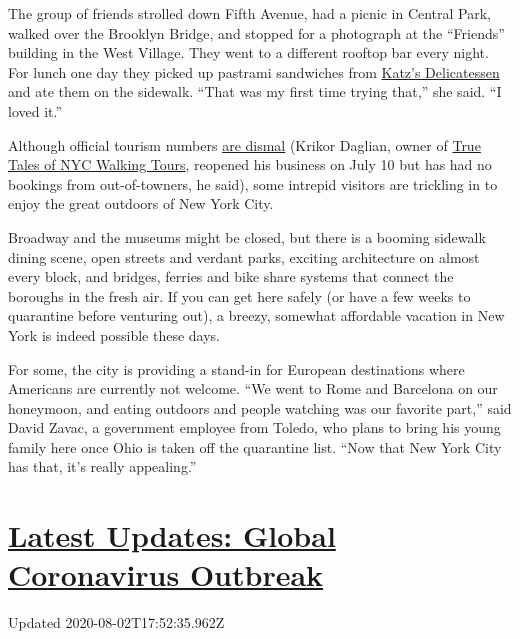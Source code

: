 The group of friends strolled down Fifth Avenue, had a picnic in Central
Park, walked over the Brooklyn Bridge, and stopped for a photograph at
the ``Friends'' building in the West Village. They went to a different
rooftop bar every night. For lunch one day they picked up pastrami
sandwiches from \href{https://katzsdelicatessen.com/}{Katz's
Delicatessen} and ate them on the sidewalk. ``That was my first time
trying that,'' she said. ``I loved it.''

Although official tourism numbers
\href{https://www.nytimes3xbfgragh.onion/2020/07/24/nyregion/nyc-tourism-coronavirus.html}{are
dismal} (Krikor Daglian, owner of
\href{http://www.truetalesnyc.com/}{True Tales of NYC Walking Tours},
reopened his business on July 10 but has had no bookings from
out-of-towners, he said), some intrepid visitors are trickling in to
enjoy the great outdoors of New York City.

Broadway and the museums might be closed, but there is a booming
sidewalk dining scene, open streets and verdant parks, exciting
architecture on almost every block, and bridges, ferries and bike share
systems that connect the boroughs in the fresh air. If you can get here
safely (or have a few weeks to quarantine before venturing out), a
breezy, somewhat affordable vacation in New York is indeed possible
these days.

For some, the city is providing a stand-in for European destinations
where Americans are currently not welcome. ``We went to Rome and
Barcelona on our honeymoon, and eating outdoors and people watching was
our favorite part,'' said David Zavac, a government employee from
Toledo, who plans to bring his young family here once Ohio is taken off
the quarantine list. ``Now that New York City has that, it's really
appealing.''

\hypertarget{latest-updates-global-coronavirus-outbreak}{%
\section{\texorpdfstring{\href{https://www.nytimes3xbfgragh.onion/2020/08/01/world/coronavirus-covid-19.html?action=click\&pgtype=Article\&state=default\&region=MAIN_CONTENT_1\&context=storylines_live_updates}{Latest
Updates: Global Coronavirus
Outbreak}}{Latest Updates: Global Coronavirus Outbreak}}\label{latest-updates-global-coronavirus-outbreak}}

Updated 2020-08-02T17:52:35.962Z

